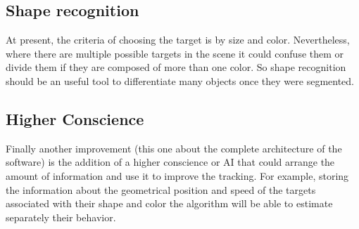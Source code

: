 	\subsection{Shape recognition}
	At present, the criteria of choosing the target is by size and color. Nevertheless, where there are multiple possible targets in the scene it could confuse them or divide them if they are composed of more than one color. So shape recognition should be an useful tool to differentiate many objects once they were segmented.
	
	
		
	\subsection{Higher Conscience}
	Finally another improvement (this one about the complete architecture of the software) is the addition of a higher conscience or AI that could arrange the amount of information and use it to improve the tracking.
	For example, storing the information about the geometrical position and speed of the targets associated with their shape and color the algorithm will be able to estimate separately their behavior.
	
	
		
		
